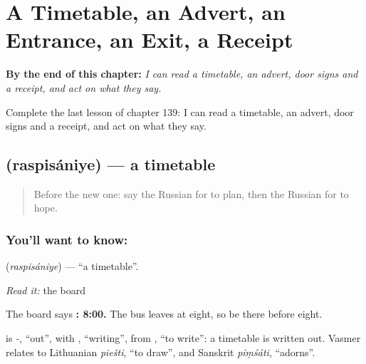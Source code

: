 
\chapter{A Timetable, an Advert, an Entrance, an Exit, a Receipt}
\label{ch:ru-a-timetable-an-advert-an-entrance-an-exit-a-receipt}

\begin{chapteropening}
\textbf{By the end of this chapter:} \emph{I can read a timetable, an advert, door signs and a receipt, and act on what they say.}

Complete the last lesson of chapter 139: I can read a timetable, an advert, door signs and a receipt, and act on what they say.
\end{chapteropening}

\section[\texorpdfstring{\ru{расписание} (raspisániye)}{расписание (raspisániye)}]{ (raspisániye) — a timetable}

\label{lesson:RU-C139-raspisaniye}



\begin{quote}
Before the new one: say the Russian for to plan, then the Russian for to hope.
\end{quote}

\subsection*{You'll want to know: }
\textbf{} (\emph{raspisániye}) — \textquotedblleft{}a timetable\textquotedblright{}.

\emph{Read it:} the board

The board says \textbf{: 8:00.} The bus leaves at eight, so be there before eight.

\begin{cousinweb}
\textbf{} is \emph{-}, \textquotedblleft{}out\textquotedblright{}, with \emph{}, \textquotedblleft{}writing\textquotedblright{}, from \emph{}, \textquotedblleft{}to write\textquotedblright{}: a timetable is written out. Vasmer relates \emph{} to Lithuanian \emph{piešti}, \textquotedblleft{}to draw\textquotedblright{}, and Sanskrit \emph{piṃśáti}, \textquotedblleft{}adorns\textquotedblright{}.
\end{cousinweb}


